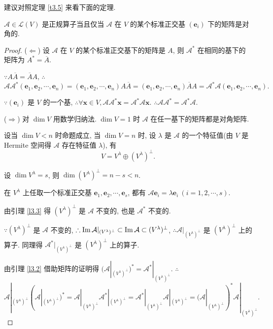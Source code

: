 \documentclass{ctexart}
\begin{document}
建议对照定理 \ref{t3.5} 来看下面的定理.
\begin{theorem}[书上的定理 11]\label{t3.7}
    $\mathcal{A}\in\mathcal{L}(V)$ 是正规算子当且仅当 $\mathcal{A}$ 在 $V$ 的某个标准正交基 $(\boldsymbol{e}_i)$ 下的矩阵是对角的.
\end{theorem}
\begin{proof}
    ($\Leftarrow$) 设 $\mathcal{A}$ 在 $V$ 的某个标准正交基下的矩阵是 $A$, 则 $\mathcal{A}^*$ 在相同的基下的矩阵为 $A^*=\overline{A}$.
    
    $\because A\overline{A}=\overline{A}A$, $\therefore$
    \[\mathcal{A}\mathcal{A}^*(\boldsymbol{e}_1,\boldsymbol{e}_2,\cdots,\boldsymbol{e}_n)=(\boldsymbol{e}_1,\boldsymbol{e}_2,\cdots,\boldsymbol{e}_n)A\overline{A}=(\boldsymbol{e}_1,\boldsymbol{e}_2,\cdots,\boldsymbol{e}_n)\overline{A}A=\mathcal{A}^*\mathcal{A}(\boldsymbol{e}_1,\boldsymbol{e}_2,\cdots,\boldsymbol{e}_n).\]

    $\because(\boldsymbol{e}_i)$ 是 $V$ 的一个基, $\therefore\forall\boldsymbol{x}\in V,\mathcal{A}\mathcal{A}^*\boldsymbol{x}=\mathcal{A}^*\mathcal{A}\boldsymbol{x}$. $\therefore\mathcal{A}\mathcal{A}^*=\mathcal{A}^*\mathcal{A}$.

    ($\Rightarrow$) 对 $\dim V$ 用数学归纳法. $\dim V=1$ 时 $\mathcal{A}$ 在任一基下的矩阵都是对角矩阵.

    设当 $\dim V<n$ 时命题成立, 当 $\dim V=n$ 时, 设 $\lambda$ 是 $\mathcal{A}$ 的一个特征值(由 $V$ 是 Hermite 空间得 $\mathcal{A}$ 存在特征值 $\lambda$), 有
    \[V=V^\lambda\oplus(V^\lambda)^\perp.\]

    设 $\dim V^\lambda=s$, 则 $\dim(V^\lambda)^\perp=n-s<n$.

    在 $V^\lambda$ 上任取一个标准正交基 $\boldsymbol{e}_1,\boldsymbol{e}_2,\cdots,\boldsymbol{e}_s$, 都有 $\mathcal{A}\boldsymbol{e}_i=\lambda\boldsymbol{e}_i\ (i=1,2,\cdots,s)$.

    由引理 \ref{l3.3} 得 $(V^\lambda)^\perp$ 是 $\mathcal{A}$ 不变的, 也是 $\mathcal{A}^*$ 不变的.

    $\because(V^\lambda)^\perp$ 是 $\mathcal{A}$ 不变的, $\therefore\operatorname{Im} \mathcal{A}|_{(V^\lambda)^\perp}\subset\operatorname{Im} \mathcal{A}\subset(V^\lambda)^\perp$, $\therefore\mathcal{A}|_{(V^\lambda)^\perp}$ 是 $(V^\lambda)^\perp$ 上的算子. 同理得 $\mathcal{A}^*|_{(V^\lambda)^\perp}$ 是 $(V^\lambda)^\perp$ 上的算子.

    由引理 \ref{l3.2} 借助矩阵的证明得 $(\mathcal{A}|_{(V^\lambda)^\perp})^*=\mathcal{A}^*|_{(V^\lambda)^\perp}$. $\therefore$
    \[\mathcal{A}|_{(V^\lambda)^\perp}(\mathcal{A}|_{(V^\lambda)^\perp})^*=\mathcal{A}|_{(V^\lambda)^\perp}\mathcal{A}^*|_{(V^\lambda)^\perp}=\mathcal{A}^*|_{(V^\lambda)^\perp}\mathcal{A}|_{(V^\lambda)^\perp}=(\mathcal{A}|_{(V^\lambda)^\perp})^*\mathcal{A}|_{(V^\lambda)^\perp}.\]


\end{proof}
\end{document}
